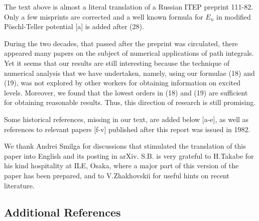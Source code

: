 \documentclass[11pt]{article}
\begin{document}
{\small

The text above is almost a literal translation of a Russian ITEP preprint
111-82. Only a few misprints are corrected and a well known formula
for $E_n$ in modified P\"oschl-Teller potential  [a] is added after (28).

During the two decades, that passed after the preprint was circulated,
there appeared many papers on the subject of numerical applications of path
integrals. Yet it seems that our results are still interesting because the
technique of numerical analysis that we have undertaken, namely, using  our formulae (18) and (19), was not explored by other workers for obtaining information
on excited levels. Moreover, we found that the lowest orders in (18) and (19)
are sufficient for obtaining reasonable results. Thus, this direction of research
is still promising.

Some historical references, missing in our text, are added below [a-e], as well
as references to relevant papers [f-v] published after this report was issued in 1982.

We thank Andrei Smilga for discussions that stimulated the translation  of this paper into English and its posting in arXiv. S.B. is very grateful to H.Takabe
for his kind hospitality at ILE, Osaka, where a major part of this version
of the paper has been prepared, and to V.Zhakhovskii for useful hints on recent literature.

\subsection*{ Additional References}

}
\end{document}
